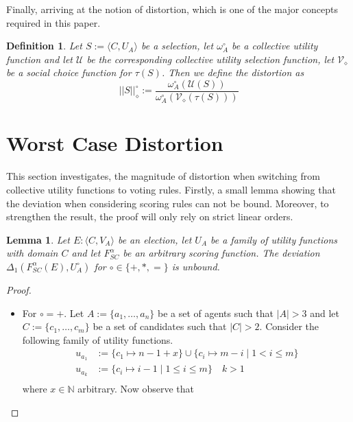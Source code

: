 \documentclass[11pt,a4paper]{article}
\newtheorem{lemma}[theorem]{Lemma}
\newtheorem{mydef}{Definition}
\begin{document}
Finally, arriving at the notion of distortion, which is one of the major concepts required in this paper.
\begin{mydef}
\label{def:distortion}
Let $S:=\langle C, U_A\rangle$ be a selection, let $\omega_A^{\circ}$ be a collective utility function and let $\mathcal{U}$ be the corresponding collective utility selection function, let $\mathcal{V}_{\diamond}$ be a social choice function for $\tau(S)$. Then we define the distortion as 
\begin{equation*}
|| S ||_{\diamond}^{\circ}:= \frac{\omega_A^{\circ}(\mathcal{U}(S))}{\omega_A^{\circ}(\mathcal{V}_{\diamond}(\tau(S)))}
\end{equation*}
\end{mydef}


\section{Worst Case Distortion}

This section investigates, the magnitude of distortion when switching from collective utility functions to voting rules. 
Firstly, a small lemma showing that the deviation when considering scoring rules can not be bound. Moreover, to strengthen the result, the proof will only rely on strict linear orders.  

\begin{lemma}
\label{lemma:wc-default-scoring}
Let $E:\langle C, V_A\rangle$ be an election, let $U_A$ be a family of utility functions with domain $C$ and let $F_{SC}^{\alpha}$ be an arbitrary scoring function. The deviation $\Delta_1(F_{SC}^{\alpha}(E), U_A^{\circ})$ for $\circ \in \{+, *, =\}$ is unbound.
\end{lemma}
\begin{proof}
\begin{itemize}
\item For $\circ = +$. Let $A:=\{a_1, \dots, a_n\}$ be a set of agents such that $|A|>3$ and let $C:=\{c_1, \dots, c_m\}$ be a set of candidates such that $|C|>2$. Consider the following family of utility functions.
\begin{equation*}
\begin{split}
u_{a_1}&:= \{ c_1 \mapsto n-1 + x\} \cup \{c_i \mapsto m-i \mid 1 < i \leq m\} \\
u_{a_k}&:= \{c_i \mapsto i-1 \mid 1 \leq i \leq m\}  \quad k>1\\
\end{split}
\end{equation*}
where $x \in \mathbb{N}$ arbitrary. Now observe that 
\end{itemize}
\end{proof}
\end{document}
